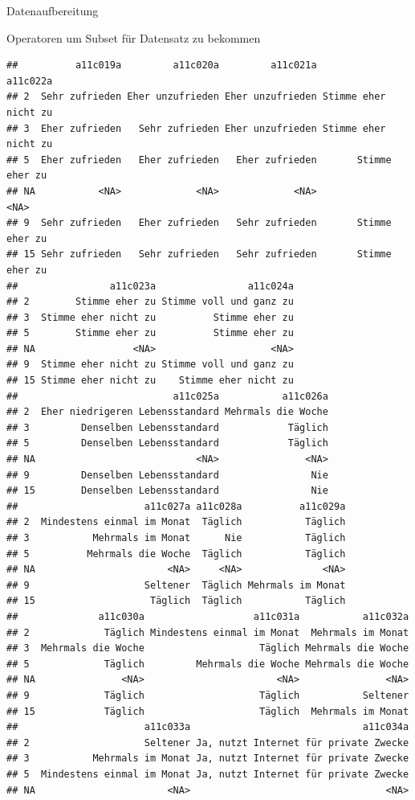 \documentclass[ignorenonframetext,]{beamer}
\begin{document}
\begin{frame}[fragile]{Datenaufbereitung}
\begin{block}{Operatoren um Subset für Datensatz zu bekommen}
\begin{verbatim}
##          a11c019a         a11c020a         a11c021a             a11c022a
## 2  Sehr zufrieden Eher unzufrieden Eher unzufrieden Stimme eher nicht zu
## 3  Eher zufrieden   Sehr zufrieden Eher unzufrieden Stimme eher nicht zu
## 5  Eher zufrieden   Eher zufrieden   Eher zufrieden       Stimme eher zu
## NA           <NA>             <NA>             <NA>                 <NA>
## 9  Sehr zufrieden   Eher zufrieden   Sehr zufrieden       Stimme eher zu
## 15 Sehr zufrieden   Sehr zufrieden   Sehr zufrieden       Stimme eher zu
##                a11c023a                a11c024a
## 2        Stimme eher zu Stimme voll und ganz zu
## 3  Stimme eher nicht zu          Stimme eher zu
## 5        Stimme eher zu          Stimme eher zu
## NA                 <NA>                    <NA>
## 9  Stimme eher nicht zu Stimme voll und ganz zu
## 15 Stimme eher nicht zu    Stimme eher nicht zu
##                           a11c025a           a11c026a
## 2  Eher niedrigeren Lebensstandard Mehrmals die Woche
## 3         Denselben Lebensstandard            Täglich
## 5         Denselben Lebensstandard            Täglich
## NA                            <NA>               <NA>
## 9         Denselben Lebensstandard                Nie
## 15        Denselben Lebensstandard                Nie
##                      a11c027a a11c028a          a11c029a
## 2  Mindestens einmal im Monat  Täglich           Täglich
## 3           Mehrmals im Monat      Nie           Täglich
## 5          Mehrmals die Woche  Täglich           Täglich
## NA                       <NA>     <NA>              <NA>
## 9                    Seltener  Täglich Mehrmals im Monat
## 15                    Täglich  Täglich           Täglich
##              a11c030a                   a11c031a           a11c032a
## 2             Täglich Mindestens einmal im Monat  Mehrmals im Monat
## 3  Mehrmals die Woche                    Täglich Mehrmals die Woche
## 5             Täglich         Mehrmals die Woche Mehrmals die Woche
## NA               <NA>                       <NA>               <NA>
## 9             Täglich                    Täglich           Seltener
## 15            Täglich                    Täglich  Mehrmals im Monat
##                      a11c033a                              a11c034a
## 2                    Seltener Ja, nutzt Internet für private Zwecke
## 3           Mehrmals im Monat Ja, nutzt Internet für private Zwecke
## 5  Mindestens einmal im Monat Ja, nutzt Internet für private Zwecke
## NA                       <NA>                                  <NA>

\end{verbatim}
\end{block}
\end{frame}
\end{document}
